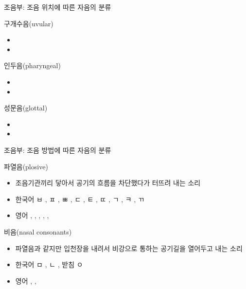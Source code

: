 \documentclass[11pt, aspectratio=169]{beamer}
\newcommand{\textds}[1]{{\ipafont #1}}
\begin{document}
\begin{frame}[t]{조음부: 조음 위치에 따른 자음의 분류}
    \begin{block}{구개수음(uvular)}
        \begin{itemize}
            \item 
            \item 
        \end{itemize}
    \end{block}
    \begin{block}{인두음(pharyngeal)}
        \begin{itemize}
            \item 
            \item 
        \end{itemize}
    \end{block}
    \begin{block}{성문음(glottal)}
        \begin{itemize}
            \item 
            \item 
        \end{itemize}
    \end{block}

\end{frame}


\begin{frame}[t]{조음부: 조음 방법에 따른 자음의 분류}
    \begin{block}{파열음(plosive)}
        \begin{itemize}
            \item 조음기관끼리 닿아서 공기의 흐름을 차단했다가 터뜨려 내는 소리
            \item 한국어 ㅂ \textds{[p]}, ㅍ \textds{[pʰ]}, ㅃ \textds{[p\textsuperscript{*}]}, ㄷ \textds{[t]}, ㅌ \textds{[tʰ]}, ㄸ \textds{[t\textsuperscript{*}]}, ㄱ \textds{[k]}, ㅋ \textds{[kʰ]}, ㄲ \textds{[k\textsuperscript{*}]}
            \item 영어 \textds{[p]}, \textds{[b]}, \textds{[t]}, \textds{[d]}, \textds{[k]}, \textds{[g]}
        \end{itemize}
    \end{block}
    \begin{block}{비음(nasal consonants)}
        \begin{itemize}
            \item 파열음과 같지만 입천장을 내려서 비강으로 통하는 공기길을 열어두고 내는 소리
            \item 한국어 ㅁ \textds{[m]}, ㄴ \textds{[n]}, 받침 ㅇ \textds{[ŋ]}
            \item 영어 \textds{[m]}, \textds{[n]}, \textds{[ŋ]}
        \end{itemize}
    \end{block}
\end{frame}
\end{document}
